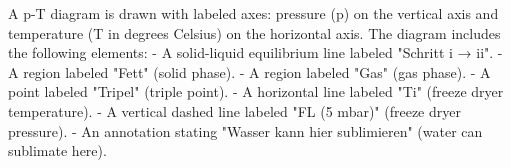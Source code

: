 A p-T diagram is drawn with labeled axes: pressure (p) on the vertical axis and temperature (T in degrees Celsius) on the horizontal axis. The diagram includes the following elements:  
- A solid-liquid equilibrium line labeled "Schritt i → ii".  
- A region labeled "Fett" (solid phase).  
- A region labeled "Gas" (gas phase).  
- A point labeled "Tripel" (triple point).  
- A horizontal line labeled "Ti" (freeze dryer temperature).  
- A vertical dashed line labeled "FL (5 mbar)" (freeze dryer pressure).  
- An annotation stating "Wasser kann hier sublimieren" (water can sublimate here).